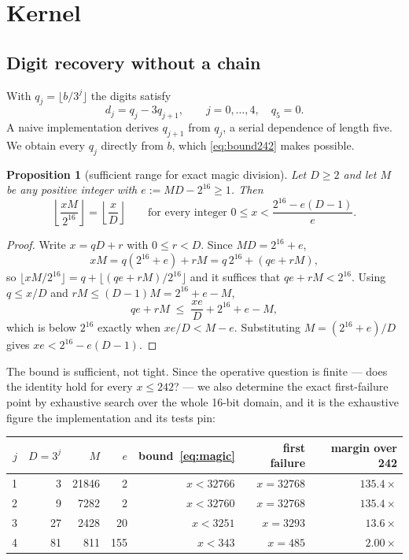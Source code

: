 \documentclass[11pt,a4paper]{article}
\newtheorem{proposition}{Proposition}
\begin{document}
\section{Kernel}\label{sec:kernel}

\subsection{Digit recovery without a chain}
With $q_{j}=\lfloor b/3^{j}\rfloor$ the digits satisfy
\begin{equation}
d_{j}=q_{j}-3q_{j+1},\qquad j=0,\dots,4,\quad q_{5}=0 .
\label{eq:digits}
\end{equation}
A naive implementation derives $q_{j+1}$ from $q_{j}$, a serial dependence of
length five. We obtain every $q_{j}$ directly from $b$, which
\eqref{eq:bound242} makes possible.

\begin{proposition}[sufficient range for exact magic division]
Let $D\ge 2$ and let $M$ be any positive integer with $e:=MD-2^{16}\ge 1$. Then
\begin{equation}
\left\lfloor\frac{xM}{2^{16}}\right\rfloor=\left\lfloor\frac{x}{D}\right\rfloor
\qquad\text{for every integer } 0\le x<\frac{2^{16}-e(D-1)}{e}.
\label{eq:magic}
\end{equation}
\end{proposition}

\begin{proof}
Write $x=qD+r$ with $0\le r<D$. Since $MD=2^{16}+e$,
\[
xM=q\left(2^{16}+e\right)+rM=q\,2^{16}+\left(qe+rM\right),
\]
so $\lfloor xM/2^{16}\rfloor=q+\lfloor (qe+rM)/2^{16}\rfloor$ and it suffices
that $qe+rM<2^{16}$. Using $q\le x/D$ and $rM\le (D-1)M=2^{16}+e-M$,
\[
qe+rM\;\le\;\frac{xe}{D}+2^{16}+e-M ,
\]
which is below $2^{16}$ exactly when $xe/D<M-e$. Substituting
$M=(2^{16}+e)/D$ gives $xe<2^{16}-e(D-1)$.
\end{proof}

The bound is sufficient, not tight. Since the operative question is finite ---
does the identity hold for every $x\le\num{242}$? --- we also determine the
exact first-failure point by exhaustive search over the whole 16-bit domain, and
it is the exhaustive figure the implementation and its tests pin:

\begin{center}
\begin{tabular}{rrrrrrr}
\toprule
$j$ & $D=3^{j}$ & $M$ & $e$ & bound~\eqref{eq:magic} & first failure & margin over 242 \\
\midrule
1 & 3  & \num{21846} & 2   & $x<\num{32766}$ & $x=\num{32768}$ & $135.4\times$ \\
2 & 9  & \num{7282}  & 2   & $x<\num{32760}$ & $x=\num{32768}$ & $135.4\times$ \\
3 & 27 & \num{2428}  & 20  & $x<\num{3251}$  & $x=\num{3293}$  & $13.6\times$ \\
4 & 81 & \num{811}   & 155 & $x<\num{343}$   & $x=\num{485}$   & $2.00\times$ \\
\bottomrule
\end{tabular}
\end{center}
\end{document}
